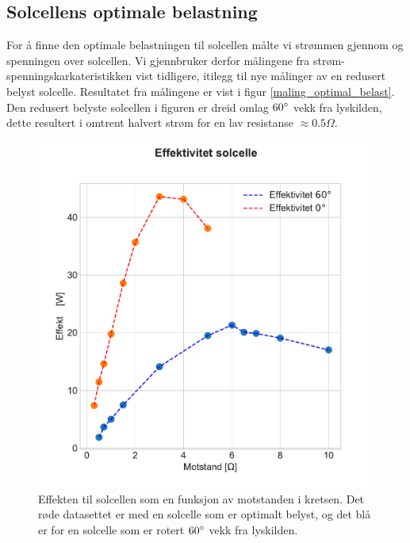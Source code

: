 \documentclass[%
 reprint,
 amsmath,amssymb,
 aps,
 norsk,
 booktabs
]{revtex4-1}
\begin{document}
\subsection{Solcellens optimale belastning}
For å finne den optimale belastningen til solcellen målte vi strømmen gjennom og spenningen over solcellen. Vi gjennbruker derfor målingene fra strøm-spenningskarkateristikken vist tidligere, itilegg til nye målinger av en redusert belyst solcelle. Resultatet fra målingene er vist i figur \vref{maling_optimal_belast}. Den redusert belyste solcellen i figuren er dreid omlag $60\degree$ vekk fra lyskilden, dette resultert i omtrent halvert strøm for en lav resistanse $\approx 0.5\Omega$.
\begin{figure}
  \centering
  \includegraphics[scale=0.4]{effekt.pdf}
  \caption{Effekten til solcellen som en funksjon av motstanden i kretsen. Det røde datasettet er med en solcelle som er optimalt belyst, og det blå er for en solcelle som er rotert $60\degree$ vekk fra lyskilden.}
  \label{maling_optimal_belast}
\end{figure}
\newpage
\end{document}
